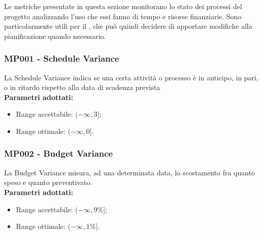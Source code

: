 Le metriche presentate in questa sezione monitorano lo stato dei processi del progetto analizzando l'uso che essi fanno di tempo e risorse finanziarie. Sono particolarmente utili per il \Res , che può quindi decidere di apportare modifiche alla pianificazione quando necessario.

\subsubsection{MP001 - Schedule Variance}\mbox{}
La Schedule Variance indica se una certa attività o processo è in anticipo, in pari, o in ritardo rispetto alla data di scadenza prevista\\[0,2cm]
\textbf{Parametri adottati:}
\begin{itemize}
	\item Range accettabile: $(-\infty , 3]$;
	\item Range ottimale: $(-\infty , 0]$.
\end{itemize}

\subsubsection{MP002 - Budget Variance}\mbox{}
La Budget Variance misura, ad una determinata data, lo scostamento fra quanto speso e quanto preventivato. \\[0,2cm]
\textbf{Parametri adottati:}
\begin{itemize}
	\item Range accettabile: $(-\infty , 9\%]$;
	\item Range ottimale: $(-\infty , 1\%]$.
\end{itemize}